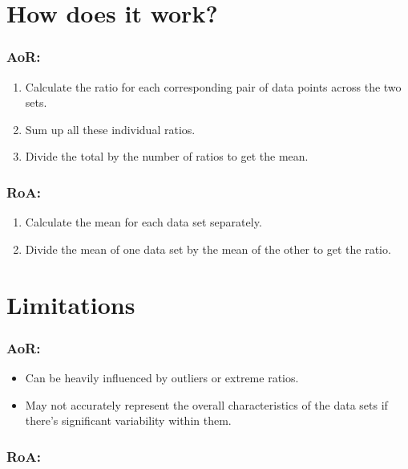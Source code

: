 \documentclass[
  letterpaper,
]{scrreprt}
\providecommand{\tightlist}{%
  \setlength{\itemsep}{0pt}\setlength{\parskip}{0pt}}
\begin{document}
\section{How does it work?}\label{how-does-it-work-7}

\subsubsection{AoR:}\label{aor}

\begin{enumerate}
\def\labelenumi{\arabic{enumi}.}
\tightlist
\item
  Calculate the ratio for each corresponding pair of data points across
  the two sets.
\item
  Sum up all these individual ratios.
\item
  Divide the total by the number of ratios to get the mean.
\end{enumerate}

\subsubsection{RoA:}\label{roa}

\begin{enumerate}
\def\labelenumi{\arabic{enumi}.}
\tightlist
\item
  Calculate the mean for each data set separately.
\item
  Divide the mean of one data set by the mean of the other to get the
  ratio.
\end{enumerate}

\section{Limitations}\label{limitations-10}

\subsubsection{AoR:}\label{aor-1}

\begin{itemize}
\tightlist
\item
  Can be heavily influenced by outliers or extreme ratios.
\item
  May not accurately represent the overall characteristics of the data
  sets if there's significant variability within them.
\end{itemize}

\subsubsection{RoA:}\label{roa-1}
\end{document}
